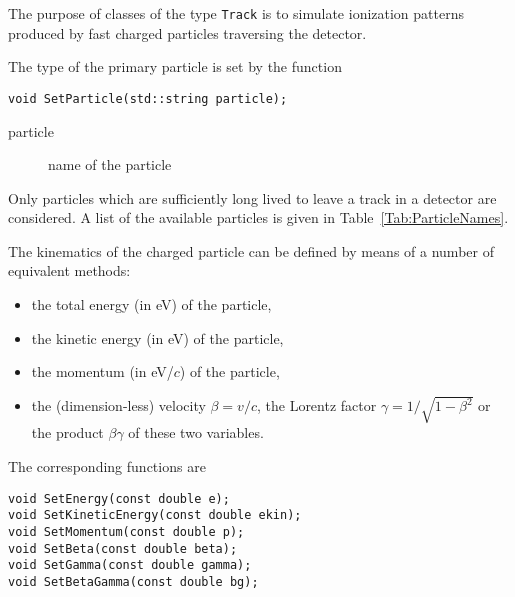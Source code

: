 The purpose of classes of the type \texttt{Track} is to simulate  
ionization patterns produced by fast charged particles traversing the detector. 

The type of the primary particle is set by the function
\begin{lstlisting}
void SetParticle(std::string particle);
\end{lstlisting}
\begin{description}
  \item[particle]
  name of the particle 
\end{description}
Only particles which are sufficiently long lived to leave a 
track in a detector are considered.
A list of the available particles is given 
in Table~\ref{Tab:ParticleNames}.

The kinematics of the charged particle can be defined 
by means of a number of equivalent methods:
  \begin{itemize}
    \item
    the total energy (in eV) of the particle,
    \item
    the kinetic energy (in eV) of the particle,
    \item
    the momentum (in eV/\(c\)) of the particle,
    \item
    the (dimension-less) velocity \(\beta = v / c\), 
    the Lorentz factor \(\gamma = 1 / \sqrt{1 - \beta^2}\) 
    or the product \(\beta\gamma\) of these two variables.
  \end{itemize}
The corresponding functions are
\begin{lstlisting}
void SetEnergy(const double e);
void SetKineticEnergy(const double ekin);
void SetMomentum(const double p);
void SetBeta(const double beta);
void SetGamma(const double gamma);
void SetBetaGamma(const double bg);
\end{lstlisting}

